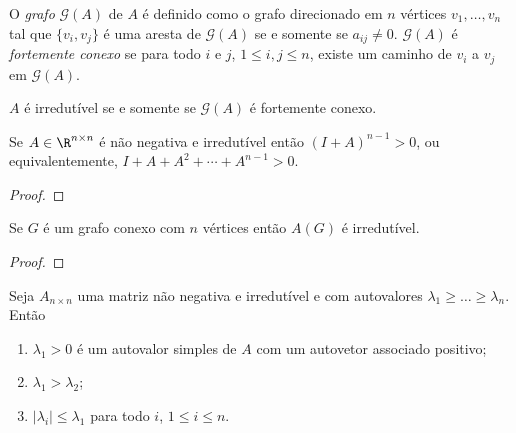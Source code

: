 \documentclass{article}
\begin{document}
\begin{appendix}
\begin{defn}
    O \emph{grafo} \(\mathcal{G}(A)\) de \(A\) é definido como o grafo direcionado em \(n\) vértices \(v_1, \ldots, v_n\) tal que \(\{v_i, v_j\}\) é uma aresta de \(\mathcal{G}(A)\) se e somente se \(a_{ij} \neq 0\). \(\mathcal{G}(A)\) é \emph{fortemente conexo} se para todo \(i\) e \(j\), \(1 \leq i,j \leq n\), existe um caminho de \(v_i\) a \(v_j\) em \(\mathcal{G}(A)\).
\end{defn}

\begin{prop}
    \(A\) é irredutível se e somente se \(\mathcal{G}(A)\) é fortemente conexo.
\end{prop}

\begin{lem}
    Se \(A \in \R^{n \times n}\) é não negativa e irredutível então \((I+A)^{n-1}>0\), ou equivalentemente, \(I + A + A^2 + \cdots + A^{n-1} > 0\).
\end{lem}

\begin{proof}
    
\end{proof}

\begin{prop}
    Se \(G\) é um grafo conexo com \(n\) vértices então \(A(G)\) é irredutível.
\end{prop}

\begin{proof}
    
\end{proof}

\begin{thm} 
    Seja \(A_{n \times n}\) uma matriz não negativa e irredutível e com autovalores \(\lambda_1 \geq \ldots \geq \lambda_n\). Então
    \begin{enumerate}
        \item [a.] \(\lambda_1 > 0\) é um autovalor simples de \(A\) com um autovetor associado positivo;
        \item [b.] \(\lambda_1 > \lambda_2\);
        \item [c.] \(\vert \lambda_i \vert \leq \lambda_1\) para todo \(i\), \(1 \leq i \leq n\).
    \end{enumerate}
\end{thm}

\end{appendix}


\newpage

\printbibliography[title={Referências}]
\end{document}
